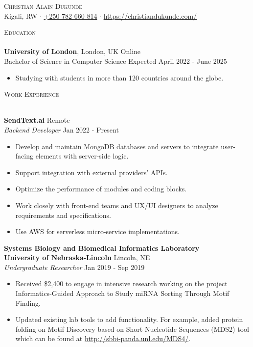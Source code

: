 \documentclass[a4paper]{article}
\newcommand{\lineunder} {
    \vspace*{-8pt} \\
    \hspace*{-18pt} \hrulefill \\
}
\newcommand{\header} [1] {
    {\hspace*{-18pt}\vspace*{6pt} \textsc{#1}}
    \vspace*{-6pt} \lineunder
}
\begin{document}
\vspace*{-40pt}

\vspace*{-10pt}
\begin{center}
	{\Huge \scshape {Christian Alain Dukunde}}\\
	Kigali, RW $\cdot$ \href{tel:+250782660814}{+250 782 660 814} $\cdot$ \url{https://christiandukunde.com/}\\
\end{center}

\header{Education}
\textbf{University of London}, London, UK Online\\
Bachelor of Science in Computer Science \hfill Expected April 2022 - June 2025\\
\begin{itemize} \itemsep 1pt
	\item Studying with students in more than 120 countries around the globe.
\end{itemize}
\vspace{2mm}

\header{Work Experience}
\vspace{1mm}

\textbf{SendText.ai} \hfill Remote\\
\textit{Backend Developer} \hfill Jan 2022 - Present\\
\vspace{-1mm}
\begin{itemize} \itemsep 1pt
	\item Develop and maintain MongoDB databases and servers to integrate user-facing elements with server-side logic.
	\item Support integration with external providers’ APIs.
	\item Optimize the performance of modules and coding blocks.
	\item Work closely with front-end teams and UX/UI designers to analyze requirements and specifications.
	\item Use AWS for serverless micro-service implementations.
\end{itemize}

\textbf{Systems Biology and Biomedical Informatics Laboratory\\ University of Nebraska-Lincoln} \hfill Lincoln, NE\\
\textit{Undergraduate Researcher} \hfill Jan 2019 - Sep 2019\\
\vspace{-1mm}
\begin{itemize} \itemsep 1pt
	\item Received \$2,400 to engage in intensive research working on the project \textquotedbl{}Informatics-Guided Approach to Study miRNA Sorting Through Motif Finding\textquotedbl{}.
	\item Updated existing lab tools to add functionality. For example, added protein folding on Motif Discovery based on Short Nucleotide Sequences (MDS2) tool which can be found at \url{http://sbbi-panda.unl.edu/MDS4/}.
\end{itemize}
\end{document}
